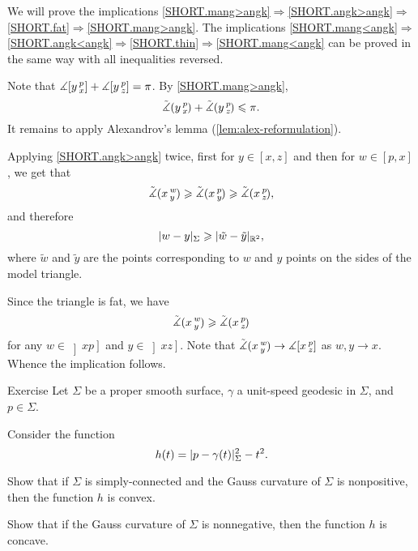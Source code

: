 We will prove the implications \ref{SHORT.mang>angk}$\Rightarrow$\ref{SHORT.angk>angk}$\Rightarrow$\ref{SHORT.fat}$\Rightarrow$\ref{SHORT.mang>angk}.
The implications \ref{SHORT.mang<angk}$\Rightarrow$\ref{SHORT.angk<angk}$\Rightarrow$\ref{SHORT.thin}$\Rightarrow$\ref{SHORT.mang<angk} can be proved in the same way with all inequalities reversed.

Note that $\measuredangle[y\,{}^{p}_{x}]+\measuredangle[y\,{}^{p}_{z}]=\pi$.
By \ref{SHORT.mang>angk}, 
\[\tilde\measuredangle(y\,{}^{p}_{x}\hspace{-0.2ex})+\tilde\measuredangle(y\,{}^{p}_{z}\hspace{-0.2ex})\leqslant \pi.\]
It remains to apply Alexandrov's lemma (\ref{lem:alex-reformulation}).

Applying \ref{SHORT.angk>angk} twice, first for $y\in [x,z]$ and then for $w\in [p,x]$, we get that
\[\tilde\measuredangle(x\,{}^{w}_{y}\hspace{-0.2ex}) \geqslant \tilde\measuredangle(x\,{}^{p}_{y}\hspace{-0.2ex}) \geqslant \tilde\measuredangle(x\,{}^{p}_{z}\hspace{-0.2ex}),\]
and therefore
\[\dist{w}{y}\Sigma\ge \dist{\tilde w}{\tilde y}{\mathbb{R}^2},\]
where $\tilde w$ and $\tilde y$ are the points corresponding to $w$ and $y$ points on the sides of the model triangle. 

Since the triangle is fat, we have 
\[\tilde\measuredangle(x\,{}^{w}_{y}\hspace{-0.2ex}) \geqslant \tilde\measuredangle(x\,{}^{p}_{z}\hspace{-0.2ex})\]
for any $w\in \left]xp\right]$ and $y\in \left]xz\right]$.
Note that $\tilde\measuredangle(x\,{}^{w}_{y}\hspace{-0.2ex})\to \measuredangle[x\,{}^{p}_{z}]$ as $w,y\to x$.
Whence the implication follows.
\qeds

\begin{thm}{Exercise}\label{ex:geod-convexity}
Let $\Sigma$ be a proper smooth surface, 
 $\gamma$ a unit-speed geodesic in $\Sigma$, and $p\in\Sigma$.

Consider the function
\[h(t)=\dist{p}{\gamma(t)}\Sigma^2-t^2.\]

\begin{subthm}{}
Show that if $\Sigma$ is simply-connected and the Gauss curvature of $\Sigma$ is nonpositive, then the function $h$ is convex.
\end{subthm}

\begin{subthm}{} Show that if the Gauss curvature of $\Sigma$ is nonnegative, then the function $h$ is concave.
\end{subthm}

\end{thm}

